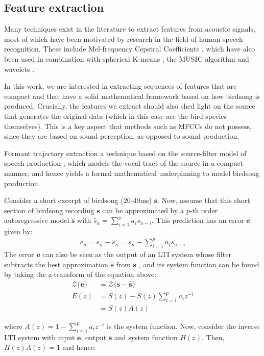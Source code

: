 \documentclass[pdftex,11pt,a4paper]{article}
\theoremstyle{definition}
\theoremstyle{remark}
\newcommand*{\V}[1]{\mathbf{#1}}%
\begin{document}
\subsection{Feature extraction}
Many techniques exist in the literature to extract features from acoustic signals, most of which have been motivated by research in the field of human speech recognition. These include Mel-frequency Cepstral Coefficients \cite{Jurafsky2009, Chou2008a, Stowell2014, Gutierrez-Osuna2009}, which have also been used in combination with spherical K-means \cite{Stowell2014}, the MUSIC algorithm \cite{Evans, Kootsookos1999} and wavelets \cite{Gamulkiewicz2003, Chou2009}.
\par In this work, we are interested in extracting sequences of features that are compact and that have a solid mathematical framework based on how birdsong is produced. Crucially, the features we extract should also shed light on the source that generates the original data (which in this case are the bird species themselves). This is a key aspect that methods such as MFCCs do not possess, since they are based on sound perception, as opposed to sound production.
\par Formant trajectory extraction a technique based on the source-filter model of speech production \cite{Snell1993}, which models the vocal tract of the source in a compact manner, and hence yields a formal mathematical underpinning to model birdsong production.
\par Consider a short excerpt of birdsong (20-40ms) $\V{s}$. Now, assume that this short section of birdsong recording $\V{s}$ can be approximated by a $p$-th order autoregressive model $\hat{\V{s}}$ with $\hat{s}_n = \sum_{i=1}^pa_is_{n-i}$. This prediction has an error $\V{e}$ given by:
\begin{align*}
e_n = s_n - \hat{s}_n = s_n - \sum_{i=1}^pa_is_{n-i}
\end{align*}
The error $\V{e}$ can also be seen as the output of an LTI system whose filter subtracts the best approximation $\hat{\V{s}}$ from $\V{s}$ \cite{Bello}, and its system function can be found by taking the z-transform of the equation above: 
\begin{align*}
\mathcal{Z}\{\V{e}\} &= \mathcal{Z}\{\V{s} - \hat{\V{s}}\}\\
E(z) &= S(z) - S(z)\sum_{i=1}^pa_iz^{-i}\\
 &= S(z)A(z)
\end{align*}
\par where $A(z) = 1 - \sum_{i=1}^pa_iz^{-i}$ is the system function. Now, consider the inverse LTI system with input $\V{e}$, output $\V{s}$ and system function $H(z)$. Then, $H(z)A(z) = 1$ and hence:
\end{document}
